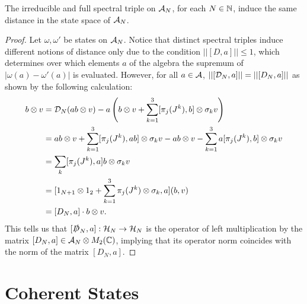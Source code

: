 \begin{theorem}\label{theoremIrreducibleAndFUllSpectralTripleSameDistance}
The irreducible and full spectral triple on $\mathcal A_N$, for each $N \in \mathbb{N}$, induce the same distance in the state space of $\mathcal A_N$.
\end{theorem}
\begin{proof}
Let $\omega, \omega'$ be states on $\mathcal A_N$. Notice that distinct spectral triples induce different notions of distance only due to the condition $||[D, a]|| \leq 1$, which determines over which elements $a$ of the algebra the supremum of $|\omega(a) - \omega'(a)|$ is evaluated. However, for all $a \in \mathcal A$, $||[\mathcal D_N, a]|| = ||[D_N, a]||$ as shown by the following calculation:
\begin{align*}
    [\dcal, a]b \otimes v &= \dcal_N(ab \otimes v) - a\left(b \otimes v + \sum_{k = 1}^3 [\pi_j(J^k), b] \otimes \sigma_k v\right)\\
        &= ab \otimes v + \sum_{k = 1}^3[\pi_j(J^k), ab] \otimes \sigma_k v - ab \otimes v - \sum_{k = 1}^3 a[\pi_j(J^k), b]\otimes \sigma_k v\\
        &= \sum_k [\pi_j(J^k), a]b \otimes \sigma_k v\\
        &= [1_{N+1} \otimes 1_2 + \sum_{k = 1}^3 \pi_j(J^k)\otimes \sigma_k, a](b, v)\\
        &= [D_N, a] \cdot b \otimes v.
\end{align*}
This tells us that $[\slashed D_N, a]: \mathcal H_N \to \mathcal H_N$ is the operator of left multiplication by the matrix $[D_N, a] \in \mathcal A_N \otimes M_2(\mathbb{C})$, implying that its operator norm coincides with the norm of the matrix $[D_N, a]$.
\end{proof}

\section{Coherent States}
\label{ChFSSectCoherentStates}
 {\color{gray}

}

